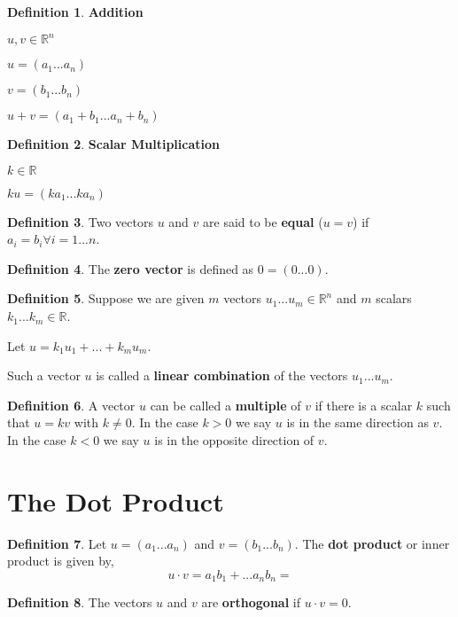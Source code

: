 \documentclass{report}
\theoremstyle{definition}
\newtheorem*{_def}{Definition}
\theoremstyle{remark}
\begin{document}
\begin{_def}
\textbf{Addition}

\(u, v \in \mathbb{R}^n\)

\(u=(a_1...a_n)\) 

\(v=(b_1...b_n)\)

\(u+v=(a_1+b_1...a_n+b_n)\)
\end{_def}

\begin{_def}
\textbf{Scalar Multiplication}

\(k\in \mathbb{R}\)

\(ku=(ka_1...ka_n)\)
\end{_def}

\begin{_def}
Two vectors \(u\) and \(v\) are said to be \textbf{equal} (\(u=v\)) if \(a_i=b_i \forall i=1...n\).
\end{_def}

\begin{_def}
The \textbf{zero vector} is defined as \(0=(0...0)\).
\end{_def}

\begin{_def}
Suppose we are given \(m\) vectors \(u_1...u_m\in \mathbb{R}^n\) and \(m\) scalars \(k_1...k_m\in \mathbb{R}\).

Let \(u=k_1u_1+...+k_mu_m\).

Such a vector \(u\) is called a \textbf{linear combination} of the vectors \(u_1...u_m\).
\end{_def}

\begin{_def}
A vector \(u\) can be called a \textbf{multiple} of \(v\) if there is a scalar \(k\) such that \(u=kv\) with \(k\neq 0\). 
In the case \(k>0\) we say \(u\) is in the same direction as \(v\). 
In the case \(k<0\) we say \(u\) is in the opposite direction of \(v\).
\end{_def}

\section{The Dot Product}

\begin{_def}
Let \(u=(a_1...a_n)\) and \(v=(b_1...b_n)\). The \textbf{dot product} or inner product is given by,
\[u\cdot v=a_1b_1+...a_nb_n=\]
\end{_def}

\begin{_def}
The vectors \(u\) and \(v\) are \textbf{orthogonal} if \(u\cdot v=0\).
\end{_def}
\end{document}
